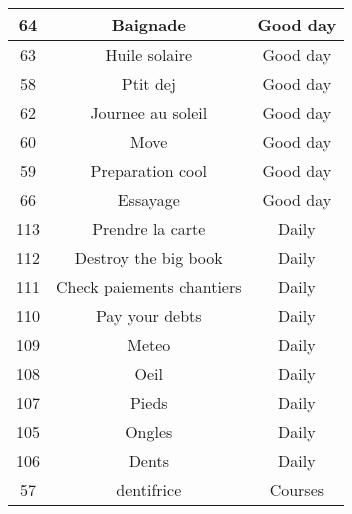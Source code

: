 \begin{longtable}{|c|c|c|}
\hline
64 & Baignade & Good day\\
\hline
63 & Huile solaire & Good day\\
\hline
58 & Ptit dej & Good day\\
\hline
62 & Journee au soleil & Good day\\
\hline
60 & Move & Good day\\
\hline
59 & Preparation cool & Good day\\
\hline
66 & Essayage & Good day\\
\hline
113 & Prendre la carte & Daily\\
\hline
112 & Destroy the big book & Daily\\
\hline
111 & Check paiements chantiers & Daily\\
\hline
110 & Pay your debts & Daily\\
\hline
109 & Meteo & Daily\\
\hline
108 & Oeil & Daily\\
\hline
107 & Pieds & Daily\\
\hline
105 & Ongles & Daily\\
\hline
106 & Dents & Daily\\
\hline
57 & dentifrice & Courses\\
\hline
\end{longtable}
